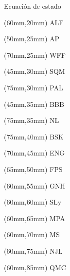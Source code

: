 \documentclass[11pt]{beamer}
\begin{document}
\begin{frame}{Ecuación de estado}
    \begin{textblock*}{0.5pt}(60mm,20mm)
    ALF
    \end{textblock*}
    \begin{textblock*}{0.5pt}(50mm,25mm)
    AP
    \end{textblock*}
    \begin{textblock*}{0.5pt}(70mm,25mm)
    WFF
    \end{textblock*}
    \begin{textblock*}{0.5pt}(45mm,30mm)
    SQM
    \end{textblock*}
    \begin{textblock*}{0.5pt}(75mm,30mm)
    PAL
    \end{textblock*}
    \begin{textblock*}{0.5pt}(45mm,35mm)
    BBB
    \end{textblock*}
    \begin{textblock*}{0.5pt}(75mm,35mm)
    NL
    \end{textblock*}
    \begin{textblock*}{0.5pt}(75mm,40mm)
    BSK
    \end{textblock*}
    \begin{textblock*}{0.5pt}(70mm,45mm)
    ENG
    \end{textblock*}
    \begin{textblock*}{0.5pt}(65mm,50mm)
    FPS
    \end{textblock*}
    \begin{textblock*}{0.5pt}(60mm,55mm)
    GNH
    \end{textblock*}
    \begin{textblock*}{0.5pt}(60mm,60mm)
    SLy
    \end{textblock*}
    \begin{textblock*}{0.5pt}(60mm,65mm)
    MPA
    \end{textblock*}
    \begin{textblock*}{0.5pt}(60mm,70mm)
    MS
    \end{textblock*}
    \begin{textblock*}{0.5pt}(60mm,75mm)
    NJL
    \end{textblock*}
    \begin{textblock*}{0.5pt}(60mm,85mm)
    QMC
    \end{textblock*}

\end{frame}
\end{document}
